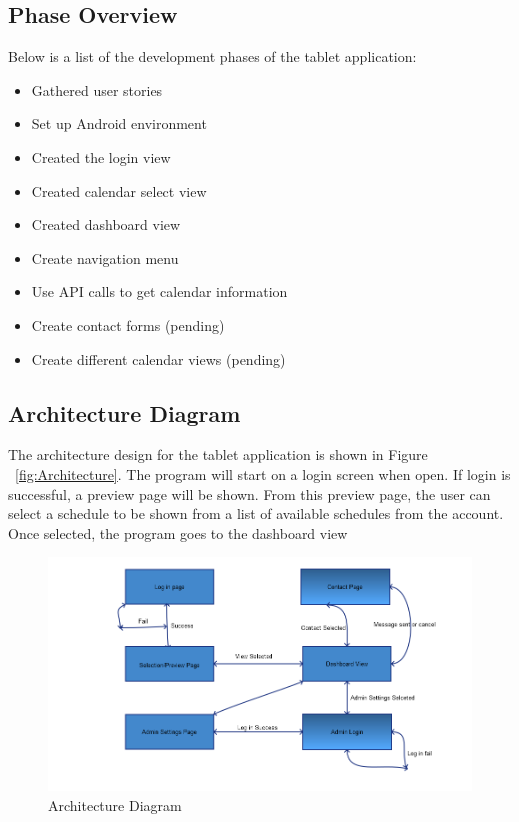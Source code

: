 \subsection{Phase Overview}


Below is a list of the development phases of the tablet application:

\begin{itemize}
\item Gathered user stories
\item Set up Android environment
\item Created the login view
\item Created calendar select view
\item Created dashboard view
\item Create navigation menu 
\item Use API calls to get calendar information 
\item Create contact forms (pending)
\item Create different calendar views (pending)
\end{itemize} 


\subsection{ Architecture  Diagram}
\label{ArchitectureSection}
The architecture design for the tablet application is shown in Figure ~\ref{fig:Architecture}. The program will start on a login screen when open. If login is successful, a preview page will be shown. From this preview page, the user can select a schedule to be shown from a list of available schedules from the account. Once selected, the program goes to the dashboard view
\begin{figure}[h!]
  \includegraphics[width=\linewidth]{graph.png}
  \caption{Architecture Diagram}
  \label{fig:ScreenArchitecture}

\end{figure}
